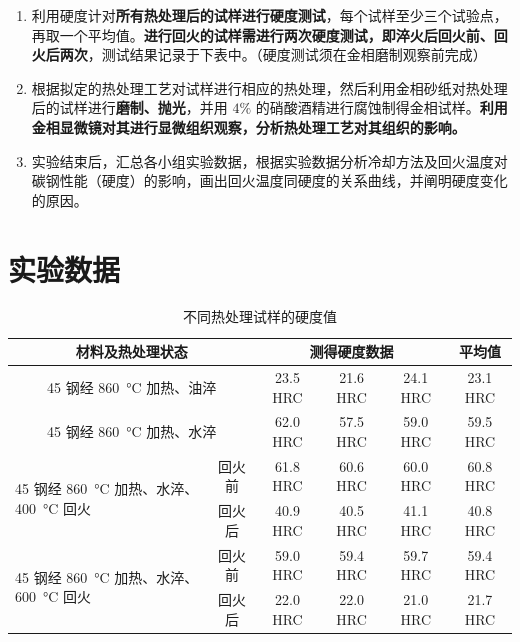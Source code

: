 \begin{enumerate}
\begin{enumerate}
            \item 45 钢淬水+高温回火工艺：加热温度为 $860 \pm \SI{10}{\degreeCelsius}$，根据试样有效尺寸计算保温时间，保温后出炉进行水淬。随后放入炉中加热至 \SI{600}{\degreeCelsius}，保温 1 个小时后出炉空冷。
        \end{enumerate}
        \item 利用硬度计对\textbf{所有热处理后的试样进行硬度测试}，每个试样至少三个试验点，再取一个平均值。\textbf{进行回火的试样需进行两次硬度测试，即淬火后回火前、回火后两次}，测试结果记录于下表中。（硬度测试须在金相磨制观察前完成）
        \item 根据拟定的热处理工艺对试样进行相应的热处理，然后利用金相砂纸对热处理后的试样进行\textbf{磨制、抛光}，并用 $4\%$ 的硝酸酒精进行腐蚀制得金相试样。\textbf{利用金相显微镜对其进行显微组织观察，分析热处理工艺对其组织的影响。}
        \item 实验结束后，汇总各小组实验数据，根据实验数据分析冷却方法及回火温度对碳钢性能（硬度）的影响，画出回火温度同硬度的关系曲线，并阐明硬度变化的原因。
    \end{enumerate}
\section{实验数据}
\begin{table}[!ht]\centering
    \caption{不同热处理试样的硬度值}
    \begin{tabular}{|m{12em}|c|*{4}{c|}}\hline
        \multicolumn{2}{|c|}{材料及热处理状态} & \multicolumn{3}{c|}{测得硬度数据} & 平均值 \bigstrut \\ \hline

        \multicolumn{2}{|c|}{45 钢经 \SI{860}{\degreeCelsius} 加热、油淬} & 23.5 HRC & 21.6 HRC & 24.1 HRC & 23.1 HRC \bigstrut \\ \hline

        \multicolumn{2}{|c|}{45 钢经 \SI{860}{\degreeCelsius} 加热、水淬} & 62.0 HRC & 57.5 HRC & 59.0 HRC & 59.5 HRC \bigstrut \\ \hline

        \multirow{2}{12em}{45 钢经 \SI{860}{\degreeCelsius} 加热、水淬、\SI{400}{\degreeCelsius} 回火} & 回火前 & 61.8 HRC & 60.6 HRC & 60.0 HRC & 60.8 HRC\bigstrut \\ \cline{2-6}
        & 回火后 & 40.9 HRC & 40.5 HRC & 41.1 HRC & 40.8 HRC \bigstrut \\ \hline

        \multirow{2}{12em}{45 钢经 \SI{860}{\degreeCelsius} 加热、水淬、\SI{600}{\degreeCelsius} 回火} & 回火前 & 59.0 HRC & 59.4 HRC & 59.7 HRC & 59.4 HRC \bigstrut \\ \cline{2-6}
        & 回火后 & 22.0 HRC & 22.0 HRC & 21.0 HRC & 21.7 HRC \bigstrut \\ \hline
    \end{tabular}
\end{table}\clearpage
